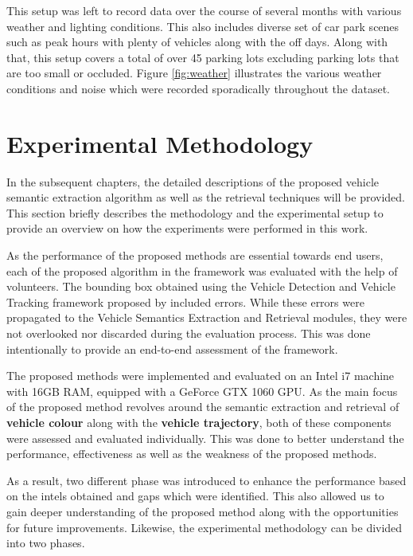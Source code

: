 This setup was left to record data over the course of several months with various weather and lighting conditions. This also includes diverse set of car park scenes such as peak hours with plenty of vehicles along with the off days. Along with that, this setup covers a total of over 45 parking lots excluding parking lots that are too small or occluded. Figure \ref{fig:weather} illustrates the various weather conditions and noise which were recorded sporadically throughout the dataset.


\section{Experimental Methodology}
\label{sec:expmethodology}

In the subsequent chapters, the detailed descriptions of the proposed vehicle semantic extraction algorithm as well as the retrieval techniques will be provided. This section briefly describes the methodology and the experimental setup to provide an overview on how the experiments were performed in this work.

As the performance of the proposed methods are essential towards end users, each of the proposed algorithm in the framework was evaluated with the help of volunteers.
The bounding box obtained using the Vehicle Detection and Vehicle Tracking framework proposed by \cite{lim2017} included errors. While these errors were propagated to the Vehicle Semantics Extraction and Retrieval modules, they were not overlooked nor discarded during the evaluation process. This was done intentionally to provide an end-to-end assessment of the framework.

The proposed methods were implemented and evaluated on an Intel i7 machine with 16GB RAM, equipped with a GeForce GTX 1060 GPU. As the main focus of the proposed method revolves around the semantic extraction and retrieval of \textbf{vehicle colour} along with the \textbf{vehicle trajectory}, both of these components were assessed and evaluated individually.
This was done to better understand the performance, effectiveness as well as the weakness of the proposed methods.

As a result, two different phase was introduced to enhance the performance based on the intels obtained and gaps which were identified. This also allowed us to gain deeper understanding of the proposed method along with the opportunities for future improvements.
Likewise, the experimental methodology can be divided into two phases.


